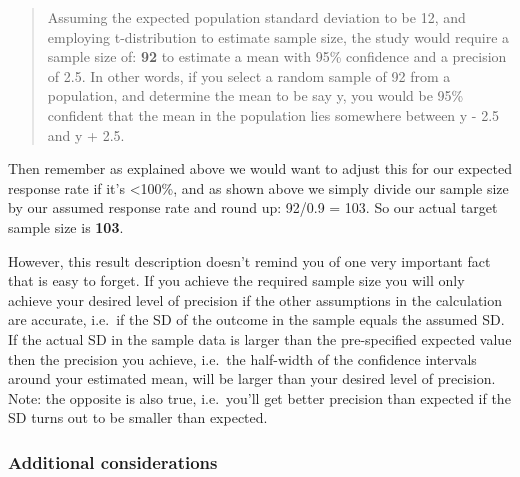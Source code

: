 \documentclass[
]{book}
\begin{document}
\begin{quote}
Assuming the expected population standard deviation to be 12, and employing t-distribution to estimate sample size, the study would require a sample size of: \textbf{92} to estimate a mean with 95\% confidence and a precision of 2.5. In other words, if you select a random sample of 92 from a population, and determine the mean to be say y, you would be 95\% confident that the mean in the population lies somewhere between y - 2.5 and y + 2.5.
\end{quote}

Then remember as explained above we would want to adjust this for our expected response rate if it's \textless100\%, and as shown above we simply divide our sample size by our assumed response rate and round up: 92/0.9 = 103. So our actual target sample size is \textbf{103}.

However, this result description doesn't remind you of one very important fact that is easy to forget. If you achieve the required sample size you will only achieve your desired level of precision if the other assumptions in the calculation are accurate, i.e.~if the SD of the outcome in the sample equals the assumed SD. If the actual SD in the sample data is larger than the pre-specified expected value then the precision you achieve, i.e.~the half-width of the confidence intervals around your estimated mean, will be larger than your desired level of precision. Note: the opposite is also true, i.e.~you'll get better precision than expected if the SD turns out to be smaller than expected.

\hypertarget{additional-considerations}{%
\subsubsection{Additional considerations}\label{additional-considerations}}
\end{document}
